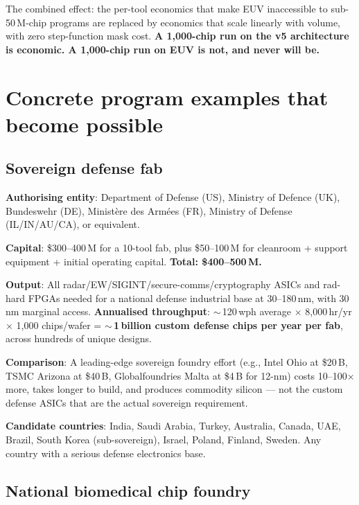 \documentclass[11pt,letterpaper]{article}
\begin{document}
The combined effect: the per-tool economics that make EUV inaccessible to sub-50\,M-chip programs are replaced by economics that scale linearly with volume, with zero step-function mask cost. \textbf{A 1{,}000-chip run on the v5 architecture is economic. A 1{,}000-chip run on EUV is not, and never will be.}

\section{Concrete program examples that become possible}

\subsection{Sovereign defense fab}

\textbf{Authorising entity}: Department of Defense (US), Ministry of Defence (UK), Bundeswehr (DE), Minist\`ere des Arm\'ees (FR), Ministry of Defense (IL/IN/AU/CA), or equivalent.

\textbf{Capital}: \$300--400\,M for a 10-tool fab, plus \$50--100\,M for cleanroom + support equipment + initial operating capital. \textbf{Total: \$400--500\,M.}

\textbf{Output}: All radar/EW/SIGINT/secure-comms/cryptography ASICs and rad-hard FPGAs needed for a national defense industrial base at 30--180\,nm, with 30\,nm marginal access. \textbf{Annualised throughput}: $\sim$\,120\,wph average $\times$ 8{,}000\,hr/yr $\times$ 1{,}000 chips/wafer = \textbf{$\sim$\,1\,billion custom defense chips per year per fab}, across hundreds of unique designs.

\textbf{Comparison}: A leading-edge sovereign foundry effort (e.g., Intel Ohio at \$20\,B, TSMC Arizona at \$40\,B, Globalfoundries Malta at \$4\,B for 12-nm) costs 10--100$\times$ more, takes longer to build, and produces commodity silicon --- not the custom defense ASICs that are the actual sovereign requirement.

\textbf{Candidate countries}: India, Saudi Arabia, Turkey, Australia, Canada, UAE, Brazil, South Korea (sub-sovereign), Israel, Poland, Finland, Sweden. Any country with a serious defense electronics base.

\subsection{National biomedical chip foundry}
\end{document}
